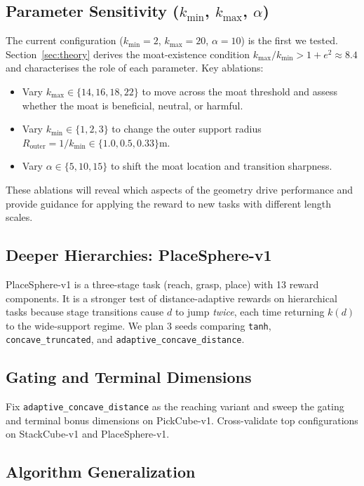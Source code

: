\documentclass{article}
\begin{document}
\subsection{Parameter Sensitivity ($k_{\min}$, $k_{\max}$, $\alpha$)}

The current configuration ($k_{\min}=2$, $k_{\max}=20$, $\alpha=10$) is the first
we tested. Section~\ref{sec:theory} derives the moat-existence condition
$k_{\max}/k_{\min} > 1+e^2 \approx 8.4$ and characterises the role of each parameter.
Key ablations:
\begin{itemize}
    \item Vary $k_{\max} \in \{14, 16, 18, 22\}$ to move across the moat threshold
    and assess whether the moat is beneficial, neutral, or harmful.
    \item Vary $k_{\min} \in \{1, 2, 3\}$ to change the outer support radius
    $R_{\mathrm{outer}} = 1/k_{\min} \in \{1.0, 0.5, 0.33\}$m.
    \item Vary $\alpha \in \{5, 10, 15\}$ to shift the moat location and transition sharpness.
\end{itemize}
These ablations will reveal which aspects of the geometry drive performance and
provide guidance for applying the reward to new tasks with different length scales.

\subsection{Deeper Hierarchies: PlaceSphere-v1}

PlaceSphere-v1 is a three-stage task (reach, grasp, place) with 13 reward components.
It is a stronger test of distance-adaptive rewards on hierarchical tasks because stage
transitions cause $d$ to jump \emph{twice}, each time returning $k(d)$ to the
wide-support regime. We plan 3 seeds comparing \texttt{tanh}, \texttt{concave\_truncated},
and \texttt{adaptive\_concave\_distance}.

\subsection{Gating and Terminal Dimensions}

Fix \texttt{adaptive\_concave\_distance} as the reaching variant and sweep the gating
and terminal bonus dimensions on PickCube-v1. Cross-validate top configurations on
StackCube-v1 and PlaceSphere-v1.

\subsection{Algorithm Generalization}
\end{document}
